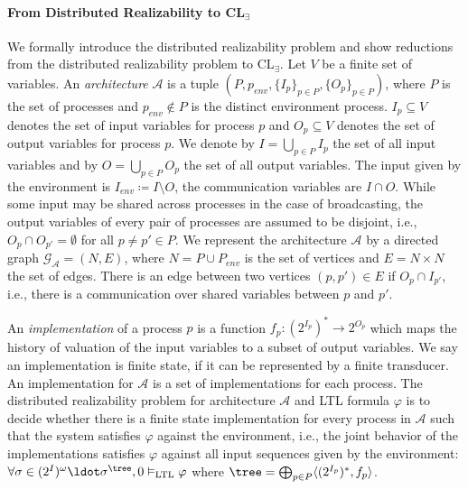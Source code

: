 \documentclass{LMCS}
\theoremstyle{plain}\newtheorem{theorem}[thm]{Theorem}
\theoremstyle{plain}\newtheorem{lemma}[thm]{Lemma}
\theoremstyle{plain}\newtheorem{proposition}[thm]{Proposition}
\theoremstyle{plain}\newtheorem{corollary}[thm]{Corollary}
\theoremstyle{definition}\newtheorem{definition}{Definition}[section]
\begin{document}
\paragraph{\bf From Distributed Realizability to CL$\bm{_\exists}$}
We formally introduce the distributed realizability problem and show reductions from the distributed realizability problem to CL$_\exists$.
Let $V$ be a finite set of variables. An \textit{architecture} $\mathcal{A}$ is a tuple $(P,p_\mathit{env},\{I_p\}_{p \in P}, \{O_p\}_{p \in P})$, where $P$ is the set of processes and $p_\mathit{env} \notin P$ is the distinct environment process.
$I_p \subseteq V$ denotes the set of input variables for process $p$ and $O_p \subseteq V$ denotes the set of output variables for process $p$.
We denote by $I = \bigcup_{p \in P} I_p$ the set of all input variables and by $O = \bigcup_{p \in P} O_p$ the set of all output variables.
The input given by the environment is $I_\mathit{env} \coloneqq I \setminus O$, the communication variables are $I \cap O$.
While some input may be shared across processes in the case of broadcasting, the output variables of every pair of processes are assumed to be disjoint, i.e., $O_p \cap O_{p'} = \emptyset$ for all $p \neq p' \in P$.
We represent the architecture $\mathcal{A}$ by a directed graph $\mathcal{G}_\mathcal{A} = (N,E)$, where $N=P\cup P_\mathit{env}$ is the set of vertices and $E = N \times N$ the set of edges.
There is an edge between two vertices $(p,p') \in E$ if $O_p \cap I_{p'}$, i.e., there is a communication over shared variables between $p$ and $p'$.

An \textit{implementation} of a process $p$ is a function $f_p : (2^{I_p})^* \rightarrow 2^{O_p}$ which maps the history of valuation of the input variables to a subset of output variables.
We say an implementation is finite state, if it can be represented by a finite transducer.
An implementation for $\mathcal{A}$ is a set of implementations for each process.
The distributed realizability problem for architecture $\mathcal{A}$ and LTL formula $\varphi$ is to decide whether there is a finite state implementation for every process in $\mathcal{A}$ such that the system satisfies $\varphi$ against the environment, i.e., the joint behavior of the implementations satisfies $\varphi$ against all input sequences given by the environment: $\forall \sigma \in (2^I)^\omega \ldot \sigma^\tree, 0 \vDash_\text{LTL} \varphi$ where $\tree = \bigoplus_{p \in P} \langle (2^{I_p})^*, f_p \rangle$.
\end{document}
